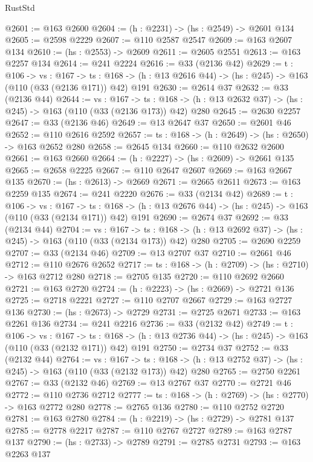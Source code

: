 \begin{lexlean}{RustStd}
\begin{coremodule}
@2601 := @163 @2600
@2604 := (h : @2231) -> (hs : @2549) -> @2601 @134
@2605 := @2598 @2229
@2607 := @110 @2587 @2547
@2609 := @163 @2607 @134
@2610 := (hs : @2553) -> @2609
@2611 := @2605 @2551
@2613 := @163 @2257 @134
@2614 := @241 @2224
@2616 := @33 (@2136 @42)
@2629 := {t : @106} ->
  {vs : @167} ->
  {ts : @168} -> (h : @13 @2616 @44) -> (hs : @245) -> @163 (@110 (@33 (@2136 @171)) @42) @191
@2630 := @2614 @37
@2632 := @33 (@2136 @44)
@2644 := {vs : @167} ->
  {ts : @168} -> (h : @13 @2632 @37) -> (hs : @245) -> @163 (@110 (@33 (@2136 @173)) @42) @280
@2645 := @2630 @2257
@2647 := @33 (@2136 @46)
@2649 := @13 @2647 @37
@2650 := @2601 @46
@2652 := @110 @2616 @2592
@2657 := {ts : @168} -> (h : @2649) -> (hs : @2650) -> @163 @2652 @280
@2658 := @2645 @134
@2660 := @110 @2632 @2600
@2661 := @163 @2660
@2664 := (h : @2227) -> (hs : @2609) -> @2661 @135
@2665 := @2658 @2225
@2667 := @110 @2647 @2607
@2669 := @163 @2667 @135
@2670 := (hs : @2613) -> @2669
@2671 := @2665 @2611
@2673 := @163 @2259 @135
@2674 := @241 @2220
@2676 := @33 (@2134 @42)
@2689 := {t : @106} ->
  {vs : @167} ->
  {ts : @168} -> (h : @13 @2676 @44) -> (hs : @245) -> @163 (@110 (@33 (@2134 @171)) @42) @191
@2690 := @2674 @37
@2692 := @33 (@2134 @44)
@2704 := {vs : @167} ->
  {ts : @168} -> (h : @13 @2692 @37) -> (hs : @245) -> @163 (@110 (@33 (@2134 @173)) @42) @280
@2705 := @2690 @2259
@2707 := @33 (@2134 @46)
@2709 := @13 @2707 @37
@2710 := @2661 @46
@2712 := @110 @2676 @2652
@2717 := {ts : @168} -> (h : @2709) -> (hs : @2710) -> @163 @2712 @280
@2718 := @2705 @135
@2720 := @110 @2692 @2660
@2721 := @163 @2720
@2724 := (h : @2223) -> (hs : @2669) -> @2721 @136
@2725 := @2718 @2221
@2727 := @110 @2707 @2667
@2729 := @163 @2727 @136
@2730 := (hs : @2673) -> @2729
@2731 := @2725 @2671
@2733 := @163 @2261 @136
@2734 := @241 @2216
@2736 := @33 (@2132 @42)
@2749 := {t : @106} ->
  {vs : @167} ->
  {ts : @168} -> (h : @13 @2736 @44) -> (hs : @245) -> @163 (@110 (@33 (@2132 @171)) @42) @191
@2750 := @2734 @37
@2752 := @33 (@2132 @44)
@2764 := {vs : @167} ->
  {ts : @168} -> (h : @13 @2752 @37) -> (hs : @245) -> @163 (@110 (@33 (@2132 @173)) @42) @280
@2765 := @2750 @2261
@2767 := @33 (@2132 @46)
@2769 := @13 @2767 @37
@2770 := @2721 @46
@2772 := @110 @2736 @2712
@2777 := {ts : @168} -> (h : @2769) -> (hs : @2770) -> @163 @2772 @280
@2778 := @2765 @136
@2780 := @110 @2752 @2720
@2781 := @163 @2780
@2784 := (h : @2219) -> (hs : @2729) -> @2781 @137
@2785 := @2778 @2217
@2787 := @110 @2767 @2727
@2789 := @163 @2787 @137
@2790 := (hs : @2733) -> @2789
@2791 := @2785 @2731
@2793 := @163 @2263 @137

\end{coremodule}
\end{lexlean}
